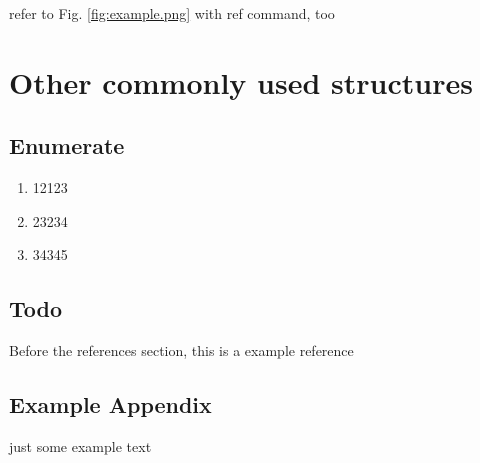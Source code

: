 \documentclass{article}
\begin{document}
refer to Fig. \ref{fig:example.png} with ref command, too

\section{Other commonly used structures}

\subsection{Enumerate}

\begin{enumerate}
	\item 12123
	\item 23234
	\item 34345
\end{enumerate}

\subsection{Todo}



Before the references section, this is a example reference\cite{craig2004quantum}






\newpage

\begin{appendices}

\section{Example Appendix}

just some example text

\end{appendices}
\end{document}

